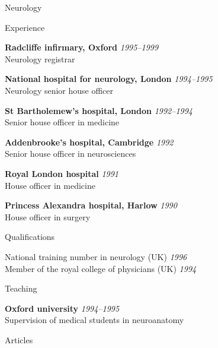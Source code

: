 \documentclass{cv}
\newcommand{\PlaceDateNote}[3]{{\bf #1} \hfill {\em #2} \\#3}
\begin{document}
\begin{cvSection}{Neurology}

\begin{cvSubSection}{Experience}

\PlaceDateNote{Radcliffe infirmary, Oxford}
{1995--1999}
{Neurology registrar}

\PlaceDateNote{National hospital for neurology, London}{1994--1995 }{
Neurology senior house officer}

\PlaceDateNote{St Bartholemew's hospital, London}{1992--1994 }{
Senior house officer in medicine}

\PlaceDateNote{Addenbrooke's hospital, Cambridge}{1992 }{
Senior house officer in neurosciences}

\PlaceDateNote{Royal London hospital}{1991 }{
House officer in medicine}

\PlaceDateNote{Princess Alexandra hospital, Harlow}{1990 }{
House officer in surgery}

\end{cvSubSection}

\begin{cvSubSection}{Qualifications}

National training number in neurology (UK) \hfill {\em 1996} \\
Member of the royal college of physicians (UK) \hfill {\em 1994}

\end{cvSubSection}

\begin{cvSubSection}{Teaching}

\PlaceDateNote{Oxford university}{1994--1995}{
Supervision of medical students in neuroanatomy}

\end{cvSubSection}

\begin{cvSubSection}{Articles}

\printbibliography[heading=none,
    keyword=neurology,
notkeyword=omit]

\end{cvSubSection}

\end{cvSection}
\end{document}
